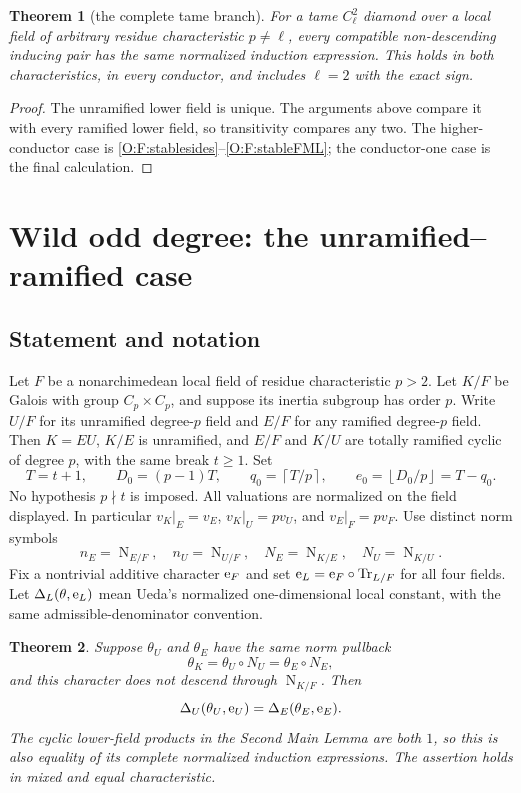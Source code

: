 \documentclass[11pt]{amsart}
\newtheorem{theorem}{Theorem}[section]
\theoremstyle{definition}
\theoremstyle{remark}
\newcommand{\Tr}{\operatorname{Tr}}
\newcommand{\Nm}{\operatorname{N}}
\newcommand{\ceil}[1]{\left\lceil #1\right\rceil}
\newcommand{\floor}[1]{\left\lfloor #1\right\rfloor}
\begin{document}
\begin{theorem}[the complete tame branch]\label{O:F:tame}
For a tame $C_\ell^2$ diamond over a local field of arbitrary residue
characteristic $p\ne\ell$, every compatible non-descending inducing pair has the
same normalized induction expression. This holds in both
characteristics, in every conductor, and includes $\ell=2$ with the
exact sign.
\end{theorem}
\begin{proof}
The unramified lower field is unique. The arguments above compare it
with every ramified lower field, so transitivity compares any two.
The higher-conductor case is \eqref{O:F:stablesides}--\eqref{O:F:stableFML};
the conductor-one case is the final calculation.
\end{proof}


\section{Wild odd degree: the unramified--ramified case}\label{O:sec:inertia}\label{sec:odd-ur}
\subsection{Statement and notation}
Let $F$ be a nonarchimedean local field of residue characteristic $p>2$.
Let $K/F$ be Galois with group $C_p\times C_p$, and suppose its inertia
subgroup has order $p$. Write $U/F$ for its unramified degree-$p$ field and
$E/F$ for any ramified degree-$p$ field. Then $K=EU$, $K/E$ is unramified,
and $E/F$ and $K/U$ are totally ramified cyclic of degree $p$, with the same
break $t\ge1$. Set
\[
 T=t+1,\qquad D_0=(p-1)T,\qquad
 q_0=\ceil{T/p},\qquad e_0=\floor{D_0/p}=T-q_0.
\]
No hypothesis $p\nmid t$ is imposed. All valuations are normalized on the
field displayed. In particular $v_K|_E=v_E$, $v_K|_U=pv_U$, and
$v_E|_F=pv_F$.
Use distinct norm symbols
\[
 n_E=\Nm_{E/F},\quad n_U=\Nm_{U/F},\quad
 N_E=\Nm_{K/E},\quad N_U=\Nm_{K/U}.
\]
Fix a nontrivial additive character $\mathrm e_F$ and set
$\echar_L=\echar_F\circ\Tr_{L/F}$ for all four fields. Let
$\Delta_L(\theta,\mathrm e_L)$ mean Ueda's normalized one-dimensional local
constant, with the same admissible-denominator convention.

\begin{theorem}\label{O:I:main}
Suppose $\theta_U$ and $\theta_E$ have the same norm pullback
\[
 \theta_K=\theta_U\circ N_U=\theta_E\circ N_E,
\]
and this character does not descend through $\Nm_{K/F}$. Then
\[
 \Delta_U(\theta_U,\mathrm e_U)=\Delta_E(\theta_E,\mathrm e_E).
\]
The cyclic lower-field products in the Second Main Lemma are both $1$, so
this is also equality of its complete normalized induction expressions.
The assertion holds in mixed and equal characteristic.
\end{theorem}
\end{document}
